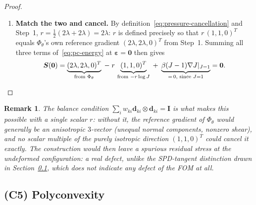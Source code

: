 \documentclass[10pt,a4paper]{article}
\newtheorem{remark}{Remark}
\begin{document}
\begin{proof}
\begin{enumerate}
\item \textbf{Match the two and cancel.} By
definition~\eqref{eq:pressure-cancellation} and Step~1,
$r=\tfrac12(2\lambda+2\lambda)=2\lambda$: $r$ is defined precisely so
that $r\,(1,1,0)^T$ equals $\Phi_\theta$'s own reference gradient
$(2\lambda,2\lambda,0)^T$ from Step~1. Summing all three terms
of~\eqref{eq:pc-energy} at $\bm\varepsilon=\bm0$ then gives
\begin{equation}
 \bm S(\bm0)=\underbrace{(2\lambda,2\lambda,0)^T}_{\text{from }\Phi_\theta}
 \;-\;r\,\underbrace{(1,1,0)^T}_{\text{from }-r\log J}
 \;+\;\underbrace{\beta(J-1)\nabla J|_{J=1}}_{=\,0\text{, since }J=1}
 =\bm0. \qedhere
\end{equation}
\end{enumerate}
\end{proof}
\begin{remark}
The balance condition $\sum_iw_{ki}\bm d_{ki}\otimes \bm d_{ki}=\bm I$ is what makes
this possible with a \emph{single} scalar $r$: without it, the reference
gradient of $\Phi_\theta$ would generally be an anisotropic $3$-vector
(unequal normal components, nonzero shear), and no scalar multiple of the
purely isotropic direction $(1,1,0)^T$ could cancel it exactly. The
construction would then leave a spurious residual stress at the
undeformed configuration: a real defect, unlike the SPD-tangent
distinction drawn in Section~\ref{sec:c5}, which does not indicate any
defect of the FOM at all.
\end{remark}

\subsection{(C5) Polyconvexity}
\label{sec:c5}
\end{document}
